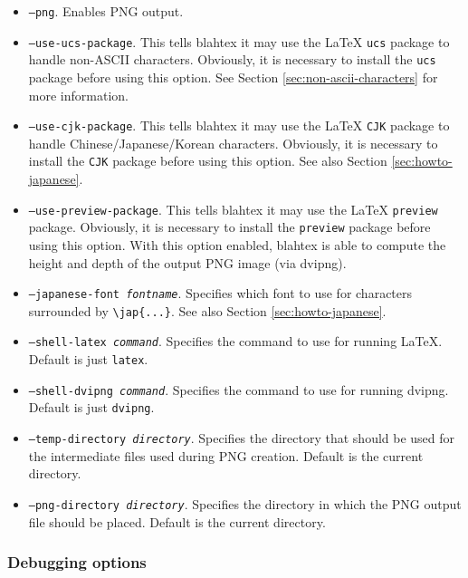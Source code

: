 \documentclass{article}
\newcommand{\texcommand}[1]{\textbackslash{}#1}
\begin{document}
\begin{itemize}
\item \texttt{--png}. Enables PNG output.
\item \texttt{--use-ucs-package}. This tells blahtex it may use the \LaTeX{} \texttt{ucs} package to handle non-ASCII characters. Obviously, it is necessary to install the \texttt{ucs} package before using this option. See Section \ref{sec:non-ascii-characters} for more information.
\item \texttt{--use-cjk-package}. This tells blahtex it may use the \LaTeX{} \texttt{CJK} package to handle Chinese/Japanese/Korean characters. Obviously, it is necessary to install the \texttt{CJK} package before using this option. See also Section \ref{sec:howto-japanese}.
\item \texttt{--use-preview-package}. This tells blahtex it may use the \LaTeX{} \texttt{preview} package. Obviously, it is necessary to install the \texttt{preview} package before using this option. With this option enabled, blahtex is able to compute the height and depth of the output PNG image (via dvipng).
\item \texttt{--japanese-font \textit{fontname}}. Specifies which font to use for characters surrounded by \texttt{\texcommand{jap}\{...\}}. See also Section \ref{sec:howto-japanese}.
\item \texttt{--shell-latex \textit{command}}. Specifies the command to use for running \LaTeX{}. Default is just \texttt{latex}.
\item \texttt{--shell-dvipng \textit{command}}. Specifies the command to use for running dvipng. Default is just \texttt{dvipng}.
\item \texttt{--temp-directory \textit{directory}}. Specifies the directory that should be used for the intermediate files used during PNG creation. Default is the current directory.
\item \texttt{--png-directory \textit{directory}}. Specifies the directory in which the PNG output file should be placed. Default is the current directory.
\end{itemize}

\subsubsection{Debugging options}
\end{document}
